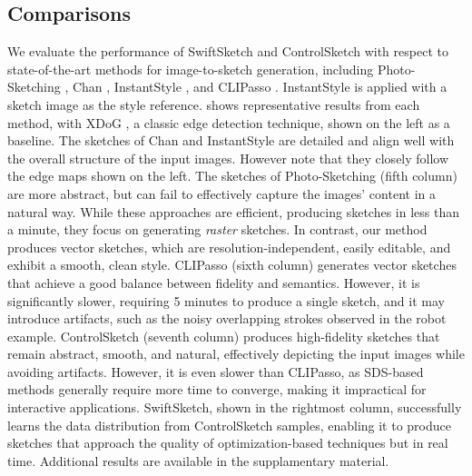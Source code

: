 \subsection{Comparisons}
We evaluate the performance of SwiftSketch and ControlSketch with respect to state-of-the-art methods for image-to-sketch generation, including Photo-Sketching \cite{Li2019PhotoSketchingIC}, Chan \etal \cite{Chan2022LearningTG}, InstantStyle \cite{Wang2024InstantStyleFL}, and CLIPasso \cite{vinker2022clipasso}. InstantStyle is applied with a sketch image as the style reference.
 shows representative results from each method, with XDoG \cite{Winnemller2011XDoGAI}, a classic edge detection technique, shown on the left as a baseline.
The sketches of Chan \etal and InstantStyle are detailed and align well with the overall structure of the input images. However note that they closely follow the edge maps shown on the left. The sketches of Photo-Sketching (fifth column) are more abstract, but can fail to effectively capture the images' content in a natural way. While these approaches are efficient, producing sketches in less than a minute, they focus on generating \emph{raster} sketches. In contrast, our method produces vector sketches, which are resolution-independent, easily editable, and exhibit a smooth, clean style.
CLIPasso (sixth column) generates vector sketches that achieve a good balance between fidelity and semantics. However, it is significantly slower, requiring 5 minutes to produce a single sketch, and it may introduce artifacts, such as the noisy overlapping strokes observed in the robot example.
ControlSketch (seventh column) produces high-fidelity sketches that remain abstract, smooth, and natural, effectively depicting the input images while avoiding artifacts. However, it is even slower than CLIPasso, as SDS-based methods generally require more time to converge, making it impractical for interactive applications.
SwiftSketch, shown in the rightmost column, successfully learns the data distribution from ControlSketch samples, enabling it to produce sketches that approach the quality of optimization-based techniques but in real time.
Additional results are available in the supplamentary material. 



